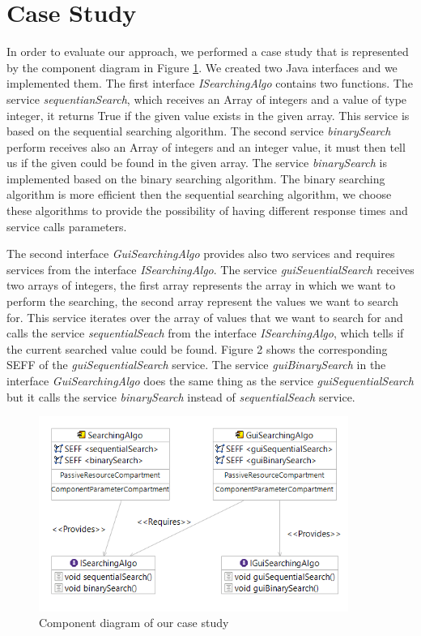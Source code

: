 \section{Case Study}
\label{sec:Case Study}
In order to evaluate our approach, we performed a case study that is represented by the component diagram in Figure \ref{fig:case_study}. We created two Java interfaces and we implemented them. The first interface \textit{ISearchingAlgo} contains two functions. The service \textit{sequentianSearch}, which receives an Array of integers and a value of type integer, it returns True if the given value exists in the given array. This service is based on the sequential searching algorithm. The second service \textit{binarySearch} perform receives also an Array of integers and an integer value, it must then tell us if the given could be found in the given array. The service \textit{binarySearch} is implemented based on the binary searching algorithm. The binary searching algorithm is more efficient then the sequential searching algorithm, we choose these algorithms to provide the possibility of having different response times and service calls parameters. 

The second interface \textit{GuiSearchingAlgo} provides also two services and requires services from the interface \textit{ISearchingAlgo}. The service \textit{guiSeuentialSearch} receives two arrays of integers, the first array represents the array in which we want to perform the searching, the second array represent the values we want to search for. This service iterates over the  array of values that we want to search for and calls the service \textit{sequentialSeach} from the interface \textit{ISearchingAlgo}, which tells if the current searched value could be found. Figure 2 shows the corresponding SEFF of the \textit{guiSequentialSearch} service. The service \textit{guiBinarySearch} in the interface \textit{GuiSearchingAlgo} does the same thing as the service \textit{guiSequentialSearch} but it calls the service \textit{binarySearch} instead of \textit{sequentialSeach} service. 

\begin{figure}[h]
\centering
\includegraphics[width=0.9\textwidth]{figures/case_study}
\caption{Component diagram of our case study}
\label{fig:case_study}
\end{figure}



